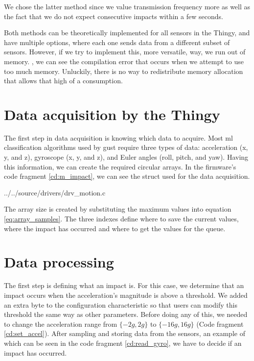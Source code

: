 We chose the latter method since we value transmission frequency more as well as the fact that we do not expect consecutive impacts within a few seconds.

Both methods can be theoretically implemented for all sensors in the Thingy, and have multiple options, where each one sends data from a different subset of sensors. However, if we try to implement this, more versatile, way, we run out of memory. , we can see the compilation error that occurs when we attempt to use too much memory. Unluckily, there is no way to redistribute memory allocation that allows that high of a consumption.

\section{Data acquisition by the Thingy}

The first step in data acquisition is knowing which data to acquire. Most \gls{ml} classification algorithms used by \gls{gust} require three types of data: acceleration (x, y, and z), gyroscope (x, y, and z), and Euler angles (roll, pitch, and yaw). Having this information, we can create the required circular arrays.  In the firmware's code fragment \ref{cd:m_impact}, we can see the struct used for the data acquisition.


{../../source/drivers/drv_motion.c}

The array size is created by substituting the maximum values into equation \ref{eq:array_samples}. The three indexes define where to save the current values, where the impact has occurred and where to get the values for the queue.

\section{Data processing}
The first step is defining what an impact is. For this case, we determine that an impact occurs when the acceleration's magnitude is above a threshold. We added an extra byte to the configuration characteristic so that users can modify this threshold the same way as other parameters. Before doing any of this, we needed to change the acceleration range from  $\{-2g, 2g\}$ to $\{-16g, 16g\}$ (Code fragment \ref{cd:set_accel}). After sampling and storing data from the sensors, an example of which can be seen in the code fragment \ref{cd:read_gyro}, we have to decide if an impact has occurred.

